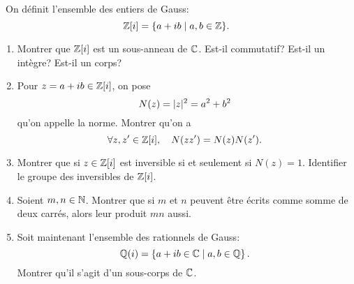 \begin{td-exo}\, %
    On définit l'ensemble des entiers de Gauss:
    \begin{equation*}
        \mathbb{Z}[i] = \{a+ib \mid a,b \in \mathbb{Z}\}.
    \end{equation*}
    \begin{enumerate}
        \item Montrer que \(\mathbb{Z}[i]\) est un sous-anneau de \(\mathbb{C}\).
        Est-il commutatif? Est-il un intègre? Est-il un corps?

        \item Pour \(z = a+ib \in \mathbb{Z}[i]\), on pose
        \begin{equation*}
            N(z) = \mathopen{}\left|z\right|\mathclose{}^2 = a^2+b^2
        \end{equation*}
        qu'on appelle la norme. Montrer qu'on a
        \begin{equation*}
            \forall z,z' \in \mathbb{Z}[i],\quad N(zz') = N(z)N(z').
        \end{equation*}

        \item Montrer que si \(z\in\mathbb{Z}[i]\) est inversible
        si et seulement si \(N(z) = 1\). Identifier le groupe
        des inversibles de \(\mathbb{Z}[i]\).

        \item Soient \(m,n\in\mathbb{N}\). Montrer que si \(m\) et \(n\) 
        peuvent être écrits comme somme de deux carrés, alors leur
        produit \(mn\) aussi.

        \item Soit maintenant l'ensemble des rationnels de Gauss:
        \begin{equation*}
            \mathbb{Q}(i) = \left\{a+ib \in \mathbb{C} \mid a,b \in \mathbb{Q}\right\}.
        \end{equation*}
        Montrer qu'il s'agit d'un sous-corps de \(\mathbb{C}\).
    \end{enumerate}
\end{td-exo}

